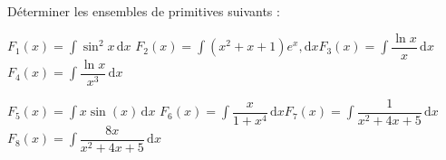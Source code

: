 
\begin{exercice}\label{exoautoanalyseCTU-28}


Déterminer les ensembles de primitives  suivants : 

$F_{1}(x)=\displaystyle\int\sin^2 x\,\mathrm dx$  \hfill$F_{2}(x)=\displaystyle\int(x^2+x+1)e^x,\mathrm dx$\hfill$F_{3}(x)=\displaystyle\int\dfrac{\ln{x}}{x}\,\mathrm dx$\hfill $F_{4}(x)=\displaystyle\int\dfrac{\ln x}{x^3}\,\mathrm dx$


$F_{5}(x)=\displaystyle\int x\sin(x)\,\mathrm dx$  \hfill$F_{6}(x)=\displaystyle\int\dfrac{x}{1+x^4}\,\mathrm dx$\hfill$F_{7}(x)=\displaystyle\int\dfrac{1}{x^2+4x+5}\,\mathrm dx$\hfill $F_{8}(x)=\displaystyle\int\dfrac{8x}{x^2+4x+5}\,\mathrm dx$







\end{exercice}
